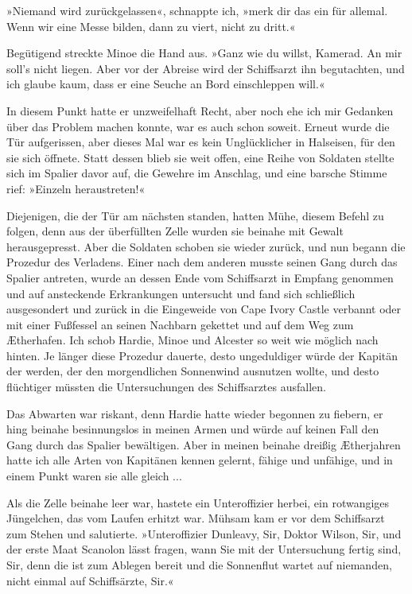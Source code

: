 »Niemand wird zurückgelassen«, schnappte ich, »merk dir das ein für
allemal. Wenn wir eine Messe bilden, dann zu viert, nicht zu
dritt.«

Begütigend streckte Minoe die Hand aus. »Ganz wie du willst,
Kamerad. An mir soll’s nicht liegen. Aber vor der Abreise wird der
Schiffsarzt ihn begutachten, und ich glaube kaum, dass er eine
Seuche an Bord einschleppen will.«

In diesem Punkt hatte er unzweifelhaft Recht, aber noch ehe ich mir
Gedanken über das Problem machen konnte, war es auch schon soweit.
Erneut wurde die Tür aufgerissen, aber dieses Mal war es kein
Unglücklicher in Halseisen, für den sie sich öffnete. Statt dessen
blieb sie weit offen, eine Reihe von Soldaten stellte sich im
Spalier davor auf, die Gewehre im Anschlag, und eine barsche Stimme
rief: »Einzeln heraustreten!«

Diejenigen, die der Tür am nächsten standen, hatten Mühe, diesem
Befehl zu folgen, denn aus der überfüllten Zelle wurden sie beinahe
mit Gewalt herausgepresst. Aber die Soldaten schoben sie wieder
zurück, und nun begann die Prozedur des Verladens. Einer nach dem
anderen musste seinen Gang durch das Spalier antreten, wurde an
dessen Ende vom Schiffsarzt in Empfang genommen und auf ansteckende
Erkrankungen untersucht und fand sich schließlich ausgesondert und
zurück in die Eingeweide von Cape Ivory Castle verbannt oder mit
einer Fußfessel an seinen Nachbarn gekettet und auf dem Weg zum
Ætherhafen. Ich schob Hardie, Minoe und Alcester so weit wie
möglich nach hinten. Je länger diese Prozedur dauerte, desto
ungeduldiger würde der Kapitän der  werden, der den
morgendlichen Sonnenwind ausnutzen wollte, und desto flüchtiger
müssten die Untersuchungen des Schiffsarztes ausfallen.

Das Abwarten war riskant, denn Hardie hatte wieder begonnen zu
fiebern, er hing beinahe besinnungslos in meinen Armen und würde
auf keinen Fall den Gang durch das Spalier bewältigen. Aber in
meinen beinahe dreißig Ætherjahren hatte ich alle Arten von
Kapitänen kennen gelernt, fähige und unfähige, und in einem Punkt
waren sie alle gleich ...

\bigpar

Als die Zelle beinahe leer war, hastete ein Unteroffizier herbei,
ein rotwangiges Jüngelchen, das vom Laufen erhitzt war. Mühsam kam
er vor dem Schiffsarzt zum Stehen und salutierte. »Unteroffizier
Dunleavy, Sir, Doktor Wilson, Sir, und der erste Maat Scanolon
lässt fragen, wann Sie mit der Untersuchung fertig sind, Sir, denn
die  ist zum Ablegen bereit und die Sonnenflut
wartet auf niemanden, nicht einmal auf Schiffsärzte, Sir.«

